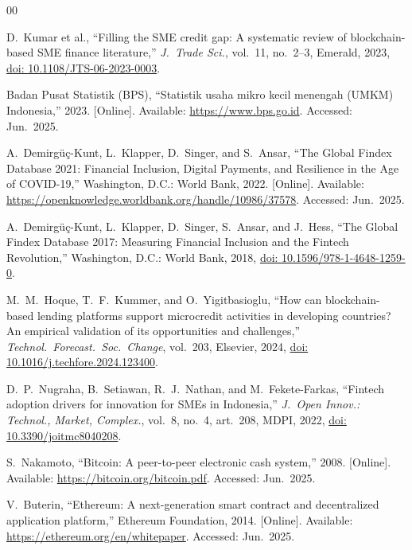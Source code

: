 \documentclass[conference]{IEEEtran}
\begin{document}
\begin{thebibliography}{00}

D.~Kumar et al.,
``Filling the SME credit gap: A systematic review of blockchain-based SME
finance literature,''
\textit{J.\ Trade Sci.}, vol.~11, no.~2--3, Emerald, 2023,
\href{https://doi.org/10.1108/JTS-06-2023-0003}{doi: 10.1108/JTS-06-2023-0003}.

Badan Pusat Statistik (BPS),
``Statistik usaha mikro kecil menengah (UMKM) Indonesia,''
2023. [Online]. Available: \url{https://www.bps.go.id}.
Accessed: Jun.\ 2025.

A.~Demirgüç-Kunt, L.~Klapper, D.~Singer, and S.~Ansar,
``The Global Findex Database 2021: Financial Inclusion, Digital Payments,
and Resilience in the Age of COVID-19,''
Washington, D.C.: World Bank, 2022. [Online]. Available:
\url{https://openknowledge.worldbank.org/handle/10986/37578}.
Accessed: Jun.\ 2025.

A.~Demirgüç-Kunt, L.~Klapper, D.~Singer, S.~Ansar, and J.~Hess,
``The Global Findex Database 2017: Measuring Financial Inclusion and the
Fintech Revolution,''
Washington, D.C.: World Bank, 2018,
\href{https://doi.org/10.1596/978-1-4648-1259-0}{doi: 10.1596/978-1-4648-1259-0}.

M.~M.~Hoque, T.~F.~Kummer, and O.~Yigitbasioglu,
``How can blockchain-based lending platforms support microcredit activities
in developing countries? An empirical validation of its opportunities and
challenges,''
\textit{Technol.\ Forecast.\ Soc.\ Change}, vol.~203, Elsevier, 2024,
\href{https://doi.org/10.1016/j.techfore.2024.123400}{doi: 10.1016/j.techfore.2024.123400}.

D.~P.~Nugraha, B.~Setiawan, R.~J.~Nathan, and M.~Fekete-Farkas,
``Fintech adoption drivers for innovation for SMEs in Indonesia,''
\textit{J.\ Open Innov.: Technol., Market, Complex.},
vol.~8, no.~4, art.~208, MDPI, 2022,
\href{https://doi.org/10.3390/joitmc8040208}{doi: 10.3390/joitmc8040208}.

S.~Nakamoto,
``Bitcoin: A peer-to-peer electronic cash system,''
2008. [Online]. Available:
\url{https://bitcoin.org/bitcoin.pdf}.
Accessed: Jun.\ 2025.

V.~Buterin,
``Ethereum: A next-generation smart contract and decentralized application
platform,''
Ethereum Foundation, 2014. [Online]. Available:
\url{https://ethereum.org/en/whitepaper}.
Accessed: Jun.\ 2025.


\end{thebibliography}
\end{document}
